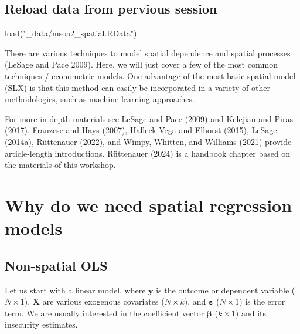 \documentclass[
  letterpaper,
  DIV=11,
  numbers=noendperiod]{scrreprt}
\newenvironment{Shaded}{\begin{snugshade}}{\end{snugshade}}
\newcommand{\FunctionTok}[1]{\textcolor[rgb]{0.28,0.35,0.67}{#1}}
\newcommand{\NormalTok}[1]{\textcolor[rgb]{0.00,0.23,0.31}{#1}}
\newcommand{\StringTok}[1]{\textcolor[rgb]{0.13,0.47,0.30}{#1}}
\begin{document}
\hypertarget{reload-data-from-pervious-session-4}{%
\subsection*{Reload data from pervious
session}\label{reload-data-from-pervious-session-4}}

\begin{Shaded}
\begin{Highlighting}[]
\FunctionTok{load}\NormalTok{(}\StringTok{"\_data/msoa2\_spatial.RData"}\NormalTok{)}
\end{Highlighting}
\end{Shaded}

There are various techniques to model spatial dependence and spatial
processes (LeSage and Pace 2009). Here, we will just cover a few of the
most common techniques / econometric models. One advantage of the most
basic spatial model (SLX) is that this method can easily be incorporated
in a variety of other methodologies, such as machine learning
approaches.

For more in-depth materials see LeSage and Pace (2009) and Kelejian and
Piras (2017). Franzese and Hays (2007), Halleck Vega and Elhorst (2015),
LeSage (2014a), Rüttenauer (2022), and Wimpy, Whitten, and Williams
(2021) provide article-length introductions. Rüttenauer (2024) is a
handbook chapter based on the materials of this workshop.

\hypertarget{why-do-we-need-spatial-regression-models}{%
\section{Why do we need spatial regression
models}\label{why-do-we-need-spatial-regression-models}}

\hypertarget{non-spatial-ols}{%
\subsection{Non-spatial OLS}\label{non-spatial-ols}}

Let us start with a linear model, where \(\boldsymbol{\mathbf{y}}\) is
the outcome or dependent variable (\(N \times 1\)),
\(\boldsymbol{\mathbf{X}}\) are various exogenous covariates
(\(N \times k\)), and \(\boldsymbol{\mathbf{\varepsilon}}\)
(\(N \times 1\)) is the error term. We are usually interested in the
coefficient vector \(\boldsymbol{\mathbf{\beta}}\) (\(k \times 1\)) and
its insecurity estimates.
\end{document}
